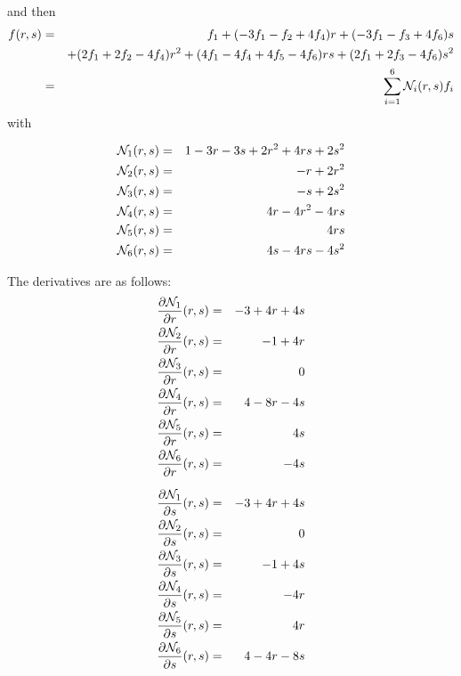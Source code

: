 and then
\begin{eqnarray}
f(r,s) 
&=& f_1 + (-3f_1-f_2+4f_4) r + (-3f_1-f_3+4f_6)s \nonumber\\
&& +(2f_1+2f_2-4f_4)r^2 + (4f_1-4f_4+4f_5-4f_6) rs + (2f_1+2f_3-4f_6)s^2 \nonumber\\
&=& \sum_{i=1}^6 {\mathcal{N}}_i(r,s) f_i
\end{eqnarray}
with
\begin{mdframed}[backgroundcolor=blue!5]
\begin{eqnarray}
{\mathcal{N}}_1(r,s) &=& 1-3r-3s+2r^2+4rs+2s^2 \nonumber\\
{\mathcal{N}}_2(r,s) &=& -r+2r^2 \nonumber\\
{\mathcal{N}}_3(r,s) &=& -s+2s^2 \nonumber\\
{\mathcal{N}}_4(r,s) &=& 4r-4r^2-4rs \nonumber\\
{\mathcal{N}}_5(r,s) &=& 4rs \nonumber\\
{\mathcal{N}}_6(r,s) &=& 4s-4rs-4s^2 \nonumber
\end{eqnarray}
\end{mdframed}

The derivatives are as follows:
\begin{eqnarray}
\frac{\partial {\mathcal{N}}_1}{\partial r}(r,s) &=&  -3+4r+4s \nonumber\\ 
\frac{\partial {\mathcal{N}}_2}{\partial r}(r,s) &=&  -1+4r\nonumber\\ 
\frac{\partial {\mathcal{N}}_3}{\partial r}(r,s) &=&  0\nonumber\\ 
\frac{\partial {\mathcal{N}}_4}{\partial r}(r,s) &=&  4-8r-4s\nonumber\\ 
\frac{\partial {\mathcal{N}}_5}{\partial r}(r,s) &=&  4s\nonumber\\ 
\frac{\partial {\mathcal{N}}_6}{\partial r}(r,s) &=&  -4s\nonumber
\end{eqnarray}

\begin{eqnarray}
\frac{\partial {\mathcal{N}}_1}{\partial s}(r,s) &=&  -3+4r+4s\nonumber\\ 
\frac{\partial {\mathcal{N}}_2}{\partial s}(r,s) &=&  0\nonumber\\ 
\frac{\partial {\mathcal{N}}_3}{\partial s}(r,s) &=&  -1+4s\nonumber\\ 
\frac{\partial {\mathcal{N}}_4}{\partial s}(r,s) &=&  -4r\nonumber\\ 
\frac{\partial {\mathcal{N}}_5}{\partial s}(r,s) &=&  4r\nonumber\\ 
\frac{\partial {\mathcal{N}}_6}{\partial s}(r,s) &=&  4-4r-8s\nonumber
\end{eqnarray}
